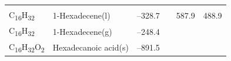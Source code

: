 \documentclass[
  9pt,
]{extbook}
\theoremstyle{definition}
\theoremstyle{definition}
\theoremstyle{definition}
\theoremstyle{remark}
\begin{document}
\begin{longtable}[]{@{}llllll@{}}
\begin{minipage}[t]{0.14\columnwidth}
\strut
\end{minipage}\tabularnewline
\begin{minipage}[t]{0.07\columnwidth}\raggedright
C\textsubscript{16}H\textsubscript{32}\strut
\end{minipage} & \begin{minipage}[t]{0.17\columnwidth}\raggedright
1-Hexadecene(l)\strut
\end{minipage} & \begin{minipage}[t]{0.15\columnwidth}\raggedright
--328.7\strut
\end{minipage} & \begin{minipage}[t]{0.15\columnwidth}\raggedright
\strut
\end{minipage} & \begin{minipage}[t]{0.14\columnwidth}\raggedright
587.9\strut
\end{minipage} & \begin{minipage}[t]{0.14\columnwidth}\raggedright
488.9\strut
\end{minipage}\tabularnewline
\begin{minipage}[t]{0.07\columnwidth}\raggedright
C\textsubscript{16}H\textsubscript{32}\strut
\end{minipage} & \begin{minipage}[t]{0.17\columnwidth}\raggedright
1-Hexadecene(g)\strut
\end{minipage} & \begin{minipage}[t]{0.15\columnwidth}\raggedright
--248.4\strut
\end{minipage} & \begin{minipage}[t]{0.15\columnwidth}\raggedright
\strut
\end{minipage} & \begin{minipage}[t]{0.14\columnwidth}\raggedright
\strut
\end{minipage} & \begin{minipage}[t]{0.14\columnwidth}\raggedright
\strut
\end{minipage}\tabularnewline
\begin{minipage}[t]{0.07\columnwidth}\raggedright
C\textsubscript{16}H\textsubscript{32}O\textsubscript{2}\strut
\end{minipage} & \begin{minipage}[t]{0.17\columnwidth}\raggedright
Hexadecanoic acid(s)\strut
\end{minipage} & \begin{minipage}[t]{0.15\columnwidth}\raggedright
--891.5\strut
\end{minipage} & \begin{minipage}[t]{0.15\columnwidth}\raggedright

\end{minipage}
\end{longtable}
\end{document}
